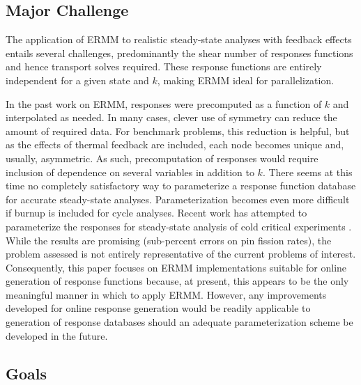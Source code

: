 \subsection{Major Challenge}

The application of ERMM to realistic steady-state analyses with 
feedback effects entails several challenges, predominantly 
the shear number of responses functions and hence transport solves
required.  These response functions are entirely independent
for a given state and $k$, making ERMM ideal for parallelization.

In the past work on ERMM, responses were precomputed as a function of 
$k$ and interpolated as needed.  In many cases, clever use of symmetry 
can reduce the amount of required data.  For benchmark problems, this
reduction is helpful, but as the effects of thermal feedback are included, 
each node becomes unique and, usually, asymmetric.  As such, precomputation 
of responses would require inclusion of dependence on several variables
in addition to $k$.
There seems at this time no completely satisfactory way to parameterize 
a response function database for accurate steady-state analyses.  
Parameterization becomes even more difficult if burnup is included 
for cycle analyses. Recent work has attempted to parameterize the 
responses for steady-state analysis of cold critical 
experiments \cite{hino2012bwr}.  While the results
are promising (sub-percent errors on pin fission rates), the problem 
assessed is not entirely representative of the current problems of interest.
Consequently, this paper focuses on ERMM implementations suitable for 
online generation of response functions because, at present, this appears 
to be the only meaningful manner in which to apply ERMM.  However, any
improvements developed for online response generation would be readily 
applicable to generation of response databases should an adequate 
parameterization scheme be developed in the future.

\subsection{Goals}


